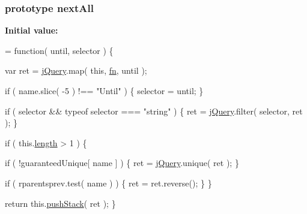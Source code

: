 \subsubsection[{next\+All}]{ {\bf prototype} next\+All}\label{jquery-1_810_82-vsdoc_8js_ab697a9d23cedbe3a7f45e620bd250001}
{\bfseries Initial value\+:}
\begin{DoxyCode}
= \textcolor{keyword}{function}( until, selector ) \{


        var ret = \hyperlink{jquery-1_810_82-vsdoc_8js_add5237586d970a38a81f990e8eb28c6c}{jQuery}.map( \textcolor{keyword}{this}, \hyperlink{jquery-1_810_82-vsdoc_8js_acef6bdaf6b9b20fdcca1ea86f0902c3b}{fn}, until );

        \textcolor{keywordflow}{if} ( name.slice( -5 ) !== \textcolor{stringliteral}{"Until"} ) \{
            selector = until;
        \}

        \textcolor{keywordflow}{if} ( selector && typeof selector === \textcolor{stringliteral}{"string"} ) \{
            ret = \hyperlink{jquery-1_810_82-vsdoc_8js_add5237586d970a38a81f990e8eb28c6c}{jQuery}.filter( selector, ret );
        \}

        \textcolor{keywordflow}{if} ( this.\hyperlink{jquery-1_810_82-vsdoc_8js_aa7de35d58da66d9944ab9cbe82c19640}{length} > 1 ) \{
            
            \textcolor{keywordflow}{if} ( !guaranteedUnique[ name ] ) \{
                ret = \hyperlink{jquery-1_810_82-vsdoc_8js_add5237586d970a38a81f990e8eb28c6c}{jQuery}.unique( ret );
            \}

            
            \textcolor{keywordflow}{if} ( rparentsprev.test( name ) ) \{
                ret = ret.reverse();
            \}
        \}

        \textcolor{keywordflow}{return} this.\hyperlink{jquery-1_810_82-vsdoc_8js_afc3a7db1ef2b526338c06c07cecccd44}{pushStack}( ret );
    \}
\end{DoxyCode}
\hypertarget{jquery-1_810_82-vsdoc_8js_af68b07d83c395633085335fd87872672}{}
